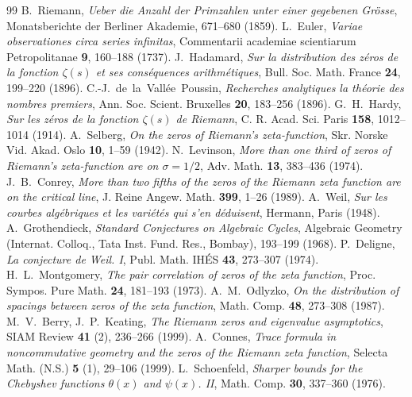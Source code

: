 \documentclass[11pt,a4paper]{article}
\theoremstyle{definition}
\theoremstyle{remark}
\numberwithin{equation}{section}
\begin{document}
\begin{thebibliography}{99}
 B.~Riemann, \emph{Ueber die Anzahl der Primzahlen unter einer gegebenen Grösse}, Monatsberichte der Berliner Akademie, 671--680 (1859).
 L.~Euler, \emph{Variae observationes circa series infinitas}, Commentarii academiae scientiarum Petropolitanae \textbf{9}, 160--188 (1737).
 J.~Hadamard, \emph{Sur la distribution des zéros de la fonction $\zeta(s)$ et ses conséquences arithmétiques}, Bull. Soc. Math. France \textbf{24}, 199--220 (1896).
 C.-J.~de~la~Vallée~Poussin, \emph{Recherches analytiques la théorie des nombres premiers}, Ann. Soc. Scient. Bruxelles \textbf{20}, 183--256 (1896).
 G.~H.~Hardy, \emph{Sur les zéros de la fonction $\zeta(s)$ de Riemann}, C. R. Acad. Sci. Paris \textbf{158}, 1012--1014 (1914).
 A.~Selberg, \emph{On the zeros of Riemann's zeta-function}, Skr. Norske Vid. Akad. Oslo \textbf{10}, 1--59 (1942).
 N.~Levinson, \emph{More than one third of zeros of Riemann's zeta-function are on $\sigma = 1/2$}, Adv. Math. \textbf{13}, 383--436 (1974).
 J.~B.~Conrey, \emph{More than two fifths of the zeros of the Riemann zeta function are on the critical line}, J. Reine Angew. Math. \textbf{399}, 1--26 (1989).
 A.~Weil, \emph{Sur les courbes algébriques et les variétés qui s'en déduisent}, Hermann, Paris (1948).
 A.~Grothendieck, \emph{Standard Conjectures on Algebraic Cycles}, Algebraic Geometry (Internat. Colloq., Tata Inst. Fund. Res., Bombay), 193--199 (1968).
 P.~Deligne, \emph{La conjecture de Weil. I}, Publ. Math. IHÉS \textbf{43}, 273--307 (1974).
 H.~L.~Montgomery, \emph{The pair correlation of zeros of the zeta function}, Proc. Sympos. Pure Math. \textbf{24}, 181--193 (1973).
 A.~M.~Odlyzko, \emph{On the distribution of spacings between zeros of the zeta function}, Math. Comp. \textbf{48}, 273--308 (1987).
 M.~V.~Berry, J.~P.~Keating, \emph{The Riemann zeros and eigenvalue asymptotics}, SIAM Review \textbf{41} (2), 236--266 (1999).
 A.~Connes, \emph{Trace formula in noncommutative geometry and the zeros of the Riemann zeta function}, Selecta Math. (N.S.) \textbf{5} (1), 29--106 (1999).
 L.~Schoenfeld, \emph{Sharper bounds for the Chebyshev functions $\theta(x)$ and $\psi(x)$. II}, Math. Comp. \textbf{30}, 337--360 (1976).
\end{thebibliography}
\end{document}
